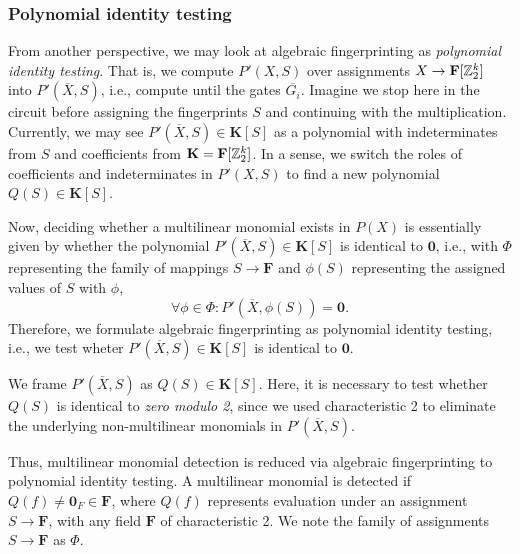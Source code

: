 \subsubsection{Polynomial identity testing}

From another perspective, we may look at algebraic fingerprinting as \emph{polynomial identity testing}. 
That is, we compute $P'(X, S)$ over assignments $X \to \mathbf{F}[\mathbb Z_2^k]$ into $P'(\overbar{X}, S)$, i.e., 
compute until the gates $\overbar{G_i}$. 
Imagine we stop here in the circuit before assigning the fingerprints $S$  
and continuing with the multiplication. 
Currently, we may see $P'(\overbar{X}, S) \in \mathbf{K}[S]$ as a polynomial 
with indeterminates from $S$ and coefficients from $\mathbf{K} = \mathbf{F}[\mathbb Z_2^k]$. 
In a sense, we switch the roles of coefficients and indeterminates in $P'(X, S)$ 
to find a new polynomial $Q(S) \in \mathbf{K}[S]$. 

Now, deciding whether a multilinear monomial exists in $P(X)$ is essentially given by 
whether the polynomial $P'(\overbar{X}, S) \in \mathbf{K}[S]$ is identical to $\mathbf{0}$, 
i.e., with $\Phi$ representing the family of mappings $S \to \mathbf{F}$ 
and $\phi(S)$ representing the assigned values of $S$ with $\phi$,  
\[
  \forall \phi \in \Phi %
  \colon P'(\overbar{X}, \phi(S)) = \mathbf{0}.
\]
Therefore, we formulate algebraic fingerprinting as polynomial identity testing, i.e., 
we test wheter $P'(\overbar{X}, S) \in \mathbf{K}[S]$ is identical to $\mathbf{0}$.

\begin{problem}
\end{problem}

We frame $P'(\overbar{X}, S)$ as $Q(S) \in \mathbf{K}[S]$. 
Here, it is necessary to test whether $Q(S)$ is identical to \emph{zero modulo 2}, 
since we used characteristic 2 to eliminate 
the underlying non-multilinear monomials in $P'(\overbar{X}, S)$.

Thus, multilinear monomial detection is reduced via algebraic fingerprinting 
to polynomial identity testing. A multilinear monomial is detected if 
$Q(f) \neq \mathbf{0}_F \in \mathbf{F}$, where $Q(f)$ 
represents evaluation under an assignment $S \to \mathbf{F}$, 
with any field $\mathbf{F}$ of characteristic 2. 
We note the family of assignments $S \to \mathbf{F}$ as $\Phi$.


